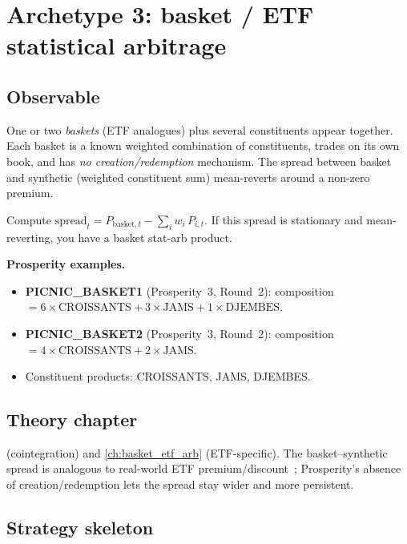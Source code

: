 \section{Archetype 3: basket / ETF statistical arbitrage}
\label{sec:archetype_basket}

\subsection{Observable}

One or two \emph{baskets} (ETF analogues) plus several constituents
appear together.  Each basket is a known weighted combination of
constituents, trades on its own book, and has \emph{no
creation/redemption} mechanism.  The spread between basket and
synthetic (weighted constituent sum) mean-reverts around a non-zero
premium.

\begin{keyfactbox}[Diagnostic]
Compute $\text{spread}_t = P_{\text{basket},t} - \sum_i w_i \,
P_{i,t}$.  If this spread is stationary and mean-reverting, you have
a basket stat-arb product.
\end{keyfactbox}

\noindent
\textbf{Prosperity examples.}
\begin{itemize}
  \item \textbf{PICNIC\_BASKET1} (Prosperity~3, Round~2): composition
  $= 6 \times \text{CROISSANTS} + 3 \times \text{JAMS} + 1 \times
  \text{DJEMBES}$.
  \item \textbf{PICNIC\_BASKET2} (Prosperity~3, Round~2): composition
  $= 4 \times \text{CROISSANTS} + 2 \times \text{JAMS}$.
  \item Constituent products: CROISSANTS, JAMS, DJEMBES.
\end{itemize}

\subsection{Theory chapter}

 (cointegration) and
\cref{ch:basket_etf_arb} (ETF-specific).  The basket--synthetic
spread is analogous to real-world ETF
premium/discount~\citep{hull8ed}; Prosperity's absence of
creation/redemption lets the spread stay wider and more persistent.

\subsection{Strategy skeleton}

